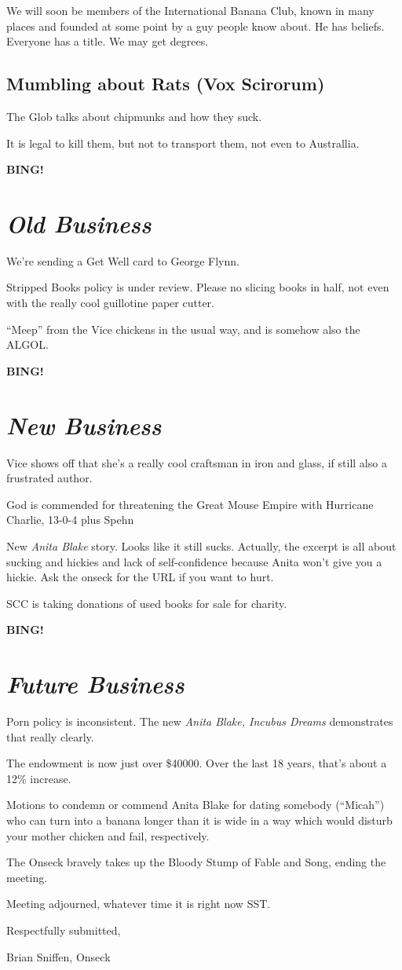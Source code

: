 \documentclass[10pt]{article}
\newcommand{\bing}{{\bf BING!} }
\newcommand{\goto}[1]{\bing \vskip 12pt \section*{{\em{#1}}}}
\newcommand{\ps}{ plus Spehn\xspace}
\begin{document}
We will soon be members of the International Banana Club, known in
many places and founded at some point by a guy people know about.  He
has beliefs.  Everyone has a title.  We may get degrees.

\subsection*{Mumbling about Rats (Vox Scirorum)}
The Glob talks about chipmunks and how they suck.

It is legal to kill them, but not to transport them, not even to
Australlia.

\goto{Old Business}
We're sending a Get Well card to George Flynn.

Stripped Books policy is under review.  Please no slicing books in
half, not even with the really cool guillotine paper cutter.

``Meep'' from the Vice chickens in the usual way, and is somehow also
the ALGOL.

\goto{New Business}

Vice shows off that she's a really cool craftsman in iron and glass,
if still also a frustrated author.

God is commended for threatening the Great Mouse Empire with Hurricane
Charlie, 13-0-4\ps

New \emph{Anita Blake} story.  Looks like it still sucks.  Actually,
the excerpt is all about sucking and hickies and lack of
self-confidence because Anita won't give you a hickie.  Ask the onseck
for the URL if you want to hurt.

SCC is taking donations of used books for sale for charity.

\goto{Future Business}
Porn policy is inconsistent.  The new \emph{Anita Blake, Incubus
  Dreams} demonstrates that really clearly.

The endowment is now just over \$40000.  Over the last 18 years,
that's about a 12\% increase.

Motions to condemn or commend Anita Blake for dating somebody
(``Micah'') who can turn into a banana longer than it is wide in a way
which would disturb your mother chicken and fail, respectively.

The Onseck bravely takes up the Bloody Stump of Fable and Song, ending
the meeting.

\vspace{12pt}

\noindent
Meeting adjourned, whatever time it is right now SST.

\vspace{18pt}

\centerline{Respectfully submitted,}
\centerline{Brian Sniffen, Onseck}
\end{document}
